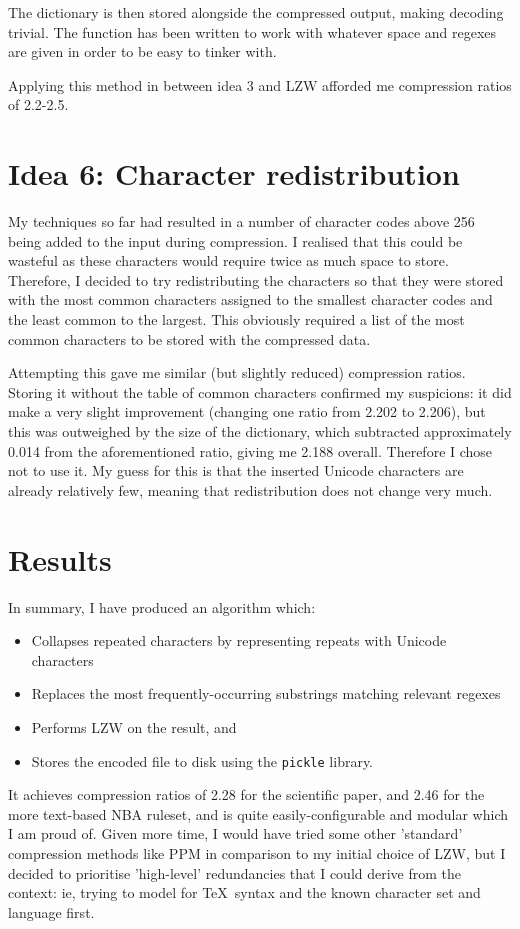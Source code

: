 \documentclass[11pt]{article} %
\begin{document}
The dictionary is then stored alongside the compressed output, making decoding trivial. The function has been written to work with whatever space and regexes are given in order to be easy to tinker with.

Applying this method in between idea 3 and LZW afforded me compression ratios of 2.2-2.5.


\section{Idea 6: Character redistribution}
My techniques so far had resulted in a number of character codes above 256 being added to the input during compression. I realised that this could be wasteful as these characters would require twice as much space to store. Therefore, I decided to try redistributing the characters so that they were stored with the most common characters assigned to the smallest character codes and the least common to the largest. This obviously required a list of the most common characters to be stored with the compressed data.

Attempting this gave me similar (but slightly reduced) compression ratios. Storing it without the table of common characters confirmed my suspicions: it did make a very slight improvement (changing one ratio from 2.202 to 2.206), but this was outweighed by the size of the dictionary, which subtracted approximately 0.014 from the aforementioned ratio, giving me 2.188 overall. Therefore I chose not to use it. My guess for this is that the inserted Unicode characters are already relatively few, meaning that redistribution does not change very much.

\pagebreak



\section{Results}
In summary, I have produced an algorithm which:

\begin{itemize}
	\item Collapses repeated characters by representing repeats with Unicode characters
	\item Replaces the most frequently-occurring substrings matching relevant regexes
	\item Performs LZW on the result, and
	\item Stores the encoded file to disk using the \verb|pickle| library.
\end{itemize}

It achieves compression ratios of 2.28 for the scientific paper, and 2.46 for the more text-based NBA ruleset, and is quite easily-configurable and modular which I am proud of. Given more time, I would have tried some other 'standard' compression methods like PPM in comparison to my initial choice of LZW, but I decided to prioritise 'high-level' redundancies that I could derive from the context: ie, trying to model for \rmfamily\TeX\normalfont\ syntax and the known character set and language first.
\end{document}
